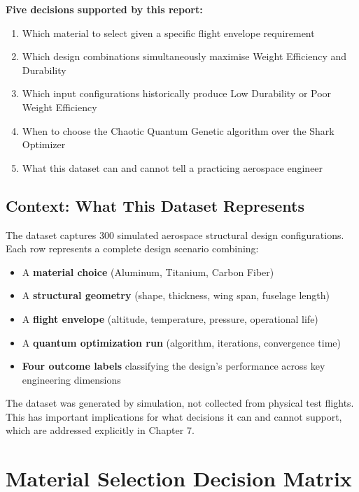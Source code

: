 \documentclass[11pt, a4paper]{report}
\begin{document}
\begin{decisionbox}
\textbf{Five decisions supported by this report:}
\begin{enumerate}[nosep]
\item Which material to select given a specific flight envelope requirement
\item Which design combinations simultaneously maximise Weight Efficiency and Durability
\item Which input configurations historically produce Low Durability or Poor Weight Efficiency
\item When to choose the Chaotic Quantum Genetic algorithm over the Shark Optimizer
\item What this dataset can and cannot tell a practicing aerospace engineer
\end{enumerate}
\end{decisionbox}

\section{Context: What This Dataset Represents}

The dataset captures 300 simulated aerospace structural design configurations. Each row represents a complete design scenario combining:
\begin{itemize}[nosep]
\item A \textbf{material choice} (Aluminum, Titanium, Carbon Fiber)
\item A \textbf{structural geometry} (shape, thickness, wing span, fuselage length)
\item A \textbf{flight envelope} (altitude, temperature, pressure, operational life)
\item A \textbf{quantum optimization run} (algorithm, iterations, convergence time)
\item \textbf{Four outcome labels} classifying the design's performance across key engineering dimensions
\end{itemize}

The dataset was generated by simulation, not collected from physical test flights. This has important implications for what decisions it can and cannot support, which are addressed explicitly in Chapter 7.


\chapter{Material Selection Decision Matrix}
\end{document}
